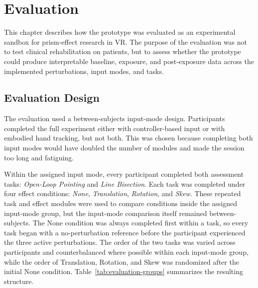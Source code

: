 \chapter{Evaluation}
\label{chap:Evaluation}

This chapter describes how the prototype was evaluated as an experimental sandbox for prism-effect research in VR. The purpose of the evaluation was not to test clinical rehabilitation on patients, but to assess whether the prototype could produce interpretable baseline, exposure, and post-exposure data across the implemented perturbations, input modes, and tasks.

\section{Evaluation Design}
\label{sec:evaluation-design}

The evaluation used a between-subjects input-mode design. Participants completed the full experiment either with controller-based input or with embodied hand tracking, but not both. This was chosen because completing both input modes would have doubled the number of modules and made the session too long and fatiguing.

Within the assigned input mode, every participant completed both assessment tasks: \emph{Open-Loop Pointing} and \emph{Line Bisection}. Each task was completed under four effect conditions: \emph{None}, \emph{Translation}, \emph{Rotation}, and \emph{Skew}. These repeated task and effect modules were used to compare conditions inside the assigned input-mode group, but the input-mode comparison itself remained between-subjects. The None condition was always completed first within a task, so every task began with a no-perturbation reference before the participant experienced the three active perturbations. The order of the two tasks was varied across participants and counterbalanced where possible within each input-mode group, while the order of Translation, Rotation, and Skew was randomized after the initial None condition. Table~\ref{tab:evaluation-groups} summarizes the resulting structure.

